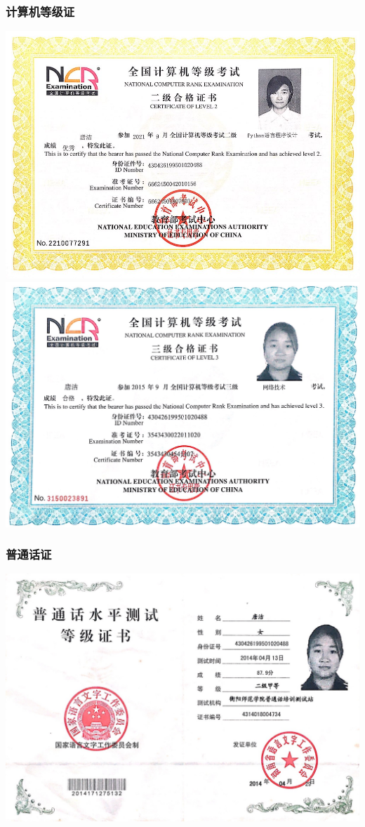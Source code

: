 \documentclass[UFT8]{ctexart}%
\begin{document}
\subsubsection{计算机等级证}
\begin{center}
\includegraphics[scale=0.4]{figs/计算机二级Python.jpg }
\includegraphics[scale=0.21]{figs/计算机三级证书.jpg }
\end{center}

\subsubsection{普通话证}
\includegraphics[scale=0.25]{figs/普通话证.jpg }
\end{document}
